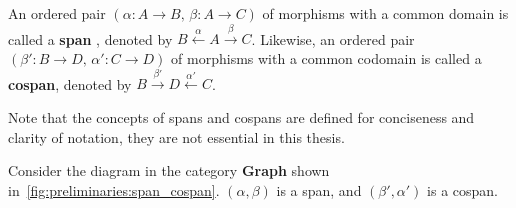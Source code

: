 \begin{definition}
An ordered pair \((\alpha : A \to B,\, \beta : A \to C)\) of morphisms with a common domain is called a \textbf{span} \cite{lowe2010graph}, denoted by
\(
B \overset{\alpha}{\leftarrow} A \overset{\beta}{\rightarrow} C
\). 
Likewise, an ordered pair \((\beta' : B \to D,\, \alpha' : C \to D)\) of morphisms with a common codomain is called a \textbf{cospan}, denoted by
\(
B \overset{\beta'}{\rightarrow} D \overset{\alpha'}{\leftarrow} C
\). 
\end{definition}
Note that the concepts of spans and cospans are defined for conciseness and clarity of notation, they are not essential in this thesis.
\begin{example}
Consider the diagram in the category \textbf{Graph} shown in~\autoref{fig:preliminaries:span_cospan}. $(\alpha, \beta)$ is a span, and $(\beta', \alpha')$ is a cospan.
\end{example}


